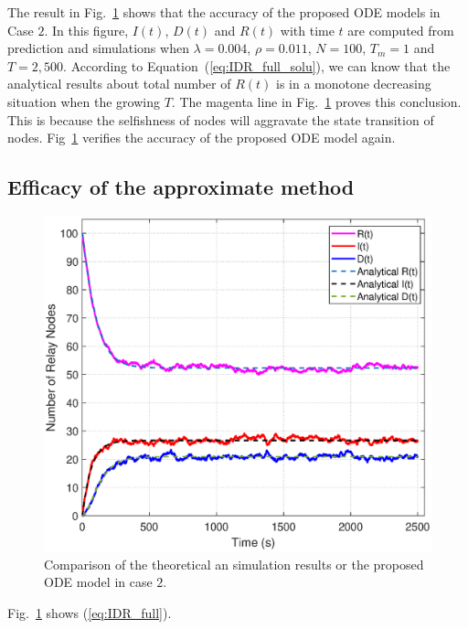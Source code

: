 The result in Fig.~\ref{fig:twohop_predict_full_d} shows that 
the accuracy of the proposed ODE models in Case $2$.
In this figure,
$I(t)$, $D(t)$ and $R(t)$ with time $t$  are computed from prediction and simulations 
when $\lambda = 0.004$, $\rho = 0.011$, $N=100$, $T_{m} = 1$ and $T=2,500$.
According to Equation~(\ref{eq:IDR_full_solu}),
we can know that the analytical results about total number of $R(t)$ is in a monotone decreasing 
situation when the growing $T$. 
The magenta line in Fig.~\ref{fig:twohop_predict_full_d} proves this conclusion.
This is because the selfishness of nodes will aggravate the state transition of nodes.
Fig~\ref{fig:twohop_predict_full_d} verifies the accuracy of the proposed ODE model again.

\subsection{Efficacy of the approximate method}
\begin{figure}
  \includegraphics[width=.45\textwidth]{fig/twohop_with_fully_detection.eps}
  \caption{Comparison of the theoretical an simulation results or the proposed ODE model in case $2$.}
  \label{fig:twohop_predict_full_d}
\end{figure}
Fig.~\ref{fig:twohop_predict_full_d} shows (\ref{eq:IDR_full}).

